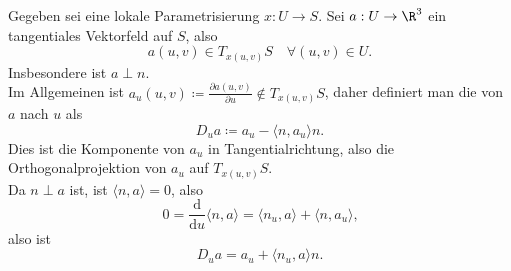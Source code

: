 \begin{definition}
  Gegeben sei eine lokale Parametrisierung $ x: U \to S $. Sei $ a : U \to \R^3 $ ein tangentiales Vektorfeld auf $ S $, also
  \begin{equation*}
    a(u,v) \in T_{x(u,v)}S \quad \forall (u,v) \in U\text{.}
  \end{equation*}
  Insbesondere ist $ a \perp n $. \\
  Im Allgemeinen ist $ a_u(u,v) \coloneqq \frac{\partial a(u,v)}{\partial u} \not \in T_{x(u,v)}S $, daher definiert man die \label{def:kovarianteAbleitung} von $ a $ nach $ u $ als
  \begin{equation*}
    D_ua \coloneqq a_u - \langle n, a_u \rangle n\text{.}
  \end{equation*}
  Dies ist die Komponente von $ a_u $ in Tangentialrichtung, also die Orthogonalprojektion von $ a_u $ auf $ T_{x(u,v)}S $. \\
  Da $ n \perp a $ ist, ist $ \langle n, a \rangle = 0 $, also
  \begin{equation*}
    0 = \frac{\text{d}}{\text{d}u}\langle n,a \rangle = \langle n_u, a \rangle + \langle n, a_u \rangle\text{,}
  \end{equation*}
  also ist
  \begin{equation*}
    D_ua = a_u + \langle n_u, a \rangle n\text{.}
  \end{equation*}
\end{definition}

